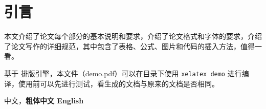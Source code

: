 \chapter{引言}
\label{chap:references}
本文介绍了论文每个部分的基本说明和要求，介绍了论文格式和字体的要求，介绍了论文写作的详细规范，其中包含了表格、公式、图片和代码的插入方法，值得一看。

基于 \LaTeXe 排版引擎，本文件（demo.pdf）可以在目录下使用 \lstinline|xelatex demo| 进行编译，使用前可以先进行测试，看生成的文档与原来的文档是否相同。

中文，{\bfseries 粗体中文 English}
